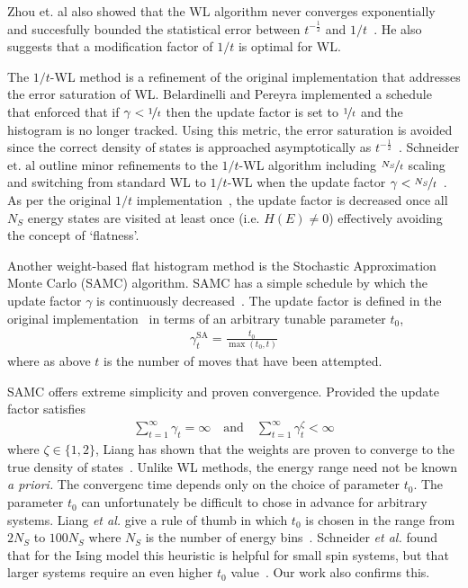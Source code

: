 \documentclass[letterpaper,twocolumn,amsmath,amssymb,pre,aps,10pt]{revtex4-1}
\begin{document}
Zhou et. al also showed that the WL algorithm never converges
exponentially~\cite{zhou2008optimal} and succesfully bounded the statistical
error between $t^{-\frac12}$ and $1/t$~\cite{zhou2008optimal}. He also suggests
that a modification factor of $1/t$ is optimal for WL.

The $1/t$-WL method is a refinement of the original implementation that
addresses the error saturation of WL. Belardinelli and Pereyra
implemented a schedule~\cite{belardinelli2007fast} that enforced that
if $\gamma < \nicefrac{1}{t}$ then the update factor is set to
$\nicefrac{1}{t}$ and the histogram is no longer tracked. Using this
metric, the error saturation is avoided since the correct density of
states is approached asymptotically as
$t^{-\frac12}$~\cite{belardinelli2008analysis}.
Schneider $\text{et. al}$ outline minor refinements to the $1/t$-WL algorithm
including $\nicefrac{N_S}{t}$ scaling and switching from standard WL to
$1/t$-WL when the update factor $\gamma <
\nicefrac{N_S}{t}$~\cite{schneider2017convergence}. As per the original
$1/t$ implementation~\cite{belardinelli2007fast}, the update factor is
decreased once all $N_S$ energy states are visited at least once (i.e.
$H(E) \neq 0$) effectively avoiding the concept of `flatness'.

Another weight-based flat histogram method is
the Stochastic Approximation Monte Carlo (SAMC) algorithm. SAMC has a simple
schedule by which the update factor $\gamma$ is continuously
decreased~\cite{liang2007stochastic, werlich2015stochastic,
schneider2017convergence}.  The update factor is defined in the
original implementation~\cite{liang2007stochastic} in terms of an
arbitrary tunable parameter $t_0$,
\begin{align}
\gamma_{t}^{\text{SA}} =\frac{t_0}{\max(t_0,t)}
\end{align}
where as above $t$ is the number of moves that have been attempted.

SAMC offers extreme simplicity and proven convergence.
Provided the update factor satisfies
\begin{align}
\sum_{t=1}^\infty \gamma_{t} = \infty \quad\textrm{and}\quad
\sum_{t=1}^\infty \gamma_{t}^\zeta < \infty
\end{align}
where $\zeta \in \{1,2\}$, Liang has shown that the weights are proven
to converge to the true density of states~\cite{liang2006theory,
liang2007stochastic}.  Unlike WL methods, the energy range need not be
known \emph{a priori.}  The convergenc time depends only on the choice of
parameter $t_0$.
The parameter $t_0$ can unfortunately be difficult to chose in advance
for arbitrary systems.
Liang \emph{et al.} give a rule of thumb in
which $t_0$ is chosen in the range from $2N_S$ to $100N_S$ where $N_S$
is the number of energy bins~\cite{liang2007stochastic}.  Schneider
\emph{et al.} found that for the Ising model this heuristic is helpful
for small spin systems, but that larger systems require an even higher
$t_0$ value~\cite{schneider2017convergence}. Our work also confirms this.
\end{document}
